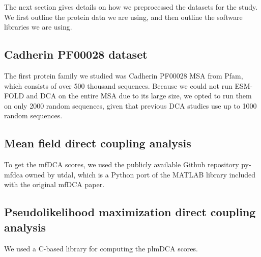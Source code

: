 \documentclass{article}
\begin{document}
The next section gives details on how we preprocessed the datasets for the study. We first outline the protein data we are using, and then outline the software libraries we are using.

\subsection{Cadherin PF00028 dataset}
The first protein family we studied was Cadherin PF00028 MSA from Pfam, which consists of over 500 thousand sequences. Because we could not run ESM-FOLD and DCA on the entire MSA due to its large size, we opted to run them on only 2000 random sequences, given that previous DCA studies use up to 1000 random sequences.

\begin{table}[]
    \centering
    \caption{The table above describes the MSA datasets used for our study along with specific preprocessing details.}
    \label{tab:my_label}
\end{table}

\subsection{Mean field direct coupling analysis}
To get the mfDCA scores, we used the publicly available Github repository py-mfdca owned by utdal\cite{pydca}, which is a Python port of the MATLAB library included with the original mfDCA paper. 

\subsection{Pseudolikelihood maximization direct coupling analysis}
We used a C-based library for computing the plmDCA scores.  
\end{document}
